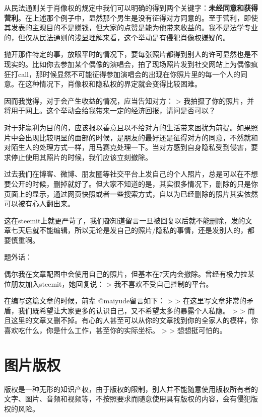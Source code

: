 \documentclass[]{ctexbook}
\begin{document}
从民法通则关于肖像权的规定中我们可以明确的得到两个关键字：\textbf{未经同意和获得营利}。在上述那个例子中，显然那个男生是没有征得对方同意的。至于营利，即使其发表的主观目的不是赚钱，但大家的点赞是能为他带来收益的。我不是法学专业的，但仅从民法通则的浅显理解来看，这个举动是有侵犯肖像权嫌疑的。

抛开那件特定的事，放眼平时的情况下，要每张照片都得到别人的许可显然也是不现实的。比如你去参加某个偶像的演唱会，拍了现场照片发到社交网站上为偶像疯狂打call，那时候显然不可能征得参加演唱会的出现在你照片里的每一个人的同意。在这种情况下，肖像权和隐私权的界定就会变得比较困难。

因而我觉得，对于会产生收益的情况，应当告知对方：
\textgreater{} 我拍摄了你的照片，并将用于网上。这个举动会给我带来一定的经济回报，请问是否可以？

对于非赢利为目的的，应该报以善意且以不给对方的生活带来困扰为前提。如果照片中会出现比较明显的面部的时候，是朋友的最好还是征得对方的同意，不然就和对陌生人的处理方式一样，用马赛克处理一下。当对方感到自身隐私受到侵害，要求停止使用其照片的时候，我们应该立刻撤除。

过去我们在博客、微博、朋友圈等社交平台上发自己的个人照片，总是可以在不想要公开的时候，删掉就好了。但大家不知道的是，其实很多情况下，删除的只是你页面上的显示，通过网页快照或者一些搜索方式，自以为已经删除的照片其实依然可以被有心人翻出来。

这在steemit上就更严苛了，我们都知道留言一旦被回复以后就不能删除，发的文章七天后就不能编辑，所以无论是发自己的照片/隐私的事情，还是发别人的，都要慎重啊。

题外话：

偶尔我在文章配图中会使用自己的照片，但基本在7天内会撤除。曾经有极力拉某位朋友加入steemit，她回复说：
\textgreater{} 我不喜欢不受自己控制的平台。

在编写这篇文章的时候，前辈 @maiyude留言如下：
\textgreater{}
\textgreater{} 在这里写文章非常的矛盾，我们既希望让大家更多的认识自己，又不希望太多的暴露个人私隐。
\textgreater{}
\textgreater{} 而且这里的文章又删不掉。有心的人甚至可以从你的文章找到你的全家人的模样，你喜欢吃什么，你是什么工作，甚至你的实际坐标。
\textgreater{}
\textgreater{} 想想挺可怕的。

\hypertarget{tpbq}{%
\section{图片版权}\label{tpbq}}

版权是一种无形的知识产权，由于版权的限制，别人并不能随意使用版权所有者的文字、图片、音频和视频等，不按照要求而随意使用具有版权的内容，会有侵犯版权的风险。
\end{document}
